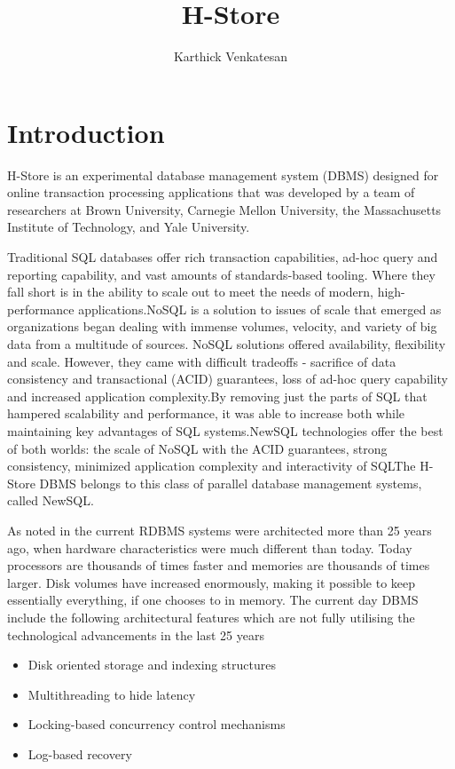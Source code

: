 \documentclass[9pt,twocolumn,twoside]{../../styles/osajnl}
\title{H-Store}
\author[1,*,+]{Karthick Venkatesan}
\affil[1]{School of Informatics and Computing, Bloomington, IN 47408, U.S.A.}
\affil[*]{Corresponding authors: vkarthickprabu@gmail.com}
\affil[+]{HID - S17-IO-3023}
\begin{document}
\maketitle

\section{Introduction}

H-Store is an experimental database management system (DBMS) designed for online transaction processing applications 
that was developed by a team of researchers  at Brown University, Carnegie Mellon University, the Massachusetts Institute of Technology, and Yale University.

Traditional SQL databases offer rich transaction capabilities, ad-hoc query and reporting capability, and vast amounts of standards-based tooling. Where they fall short is in the ability to scale out to meet the needs of modern, high-performance applications.NoSQL is  a solution to issues of scale that emerged as organizations began dealing with immense volumes, velocity, and variety of big data from a multitude of sources. NoSQL solutions offered availability, flexibility and scale. However, they came with difficult tradeoffs - sacrifice of data consistency and transactional (ACID) guarantees, loss of ad-hoc query capability and increased application complexity.By removing just the parts of SQL that hampered scalability and performance, it was able to increase both while maintaining key advantages of SQL systems.NewSQL technologies offer the best of both worlds: the scale of NoSQL with the ACID guarantees, strong consistency, minimized application complexity and interactivity of SQLThe H-Store DBMS belongs to this class of parallel database management systems, called NewSQL.

As noted in \cite{stonebraker2007} the current RDBMS systems were architected more than 25 years ago, when
hardware characteristics were much different than today.
Today processors are thousands of times faster and memories are
thousands of times larger. Disk volumes have increased
enormously, making it possible to keep essentially everything, if
one chooses to in memory. The current day DBMS 
include the following architectural features which are not fully utilising 
the technological advancements in the last 25 years
\begin{itemize}
\renewcommand{\labelitemi}{\scriptsize$\bullet$} 
\item Disk oriented storage and indexing structures
\item Multithreading to hide latency
\item Locking-based concurrency control mechanisms
\item Log-based recovery
\end{itemize}
\end{document}
